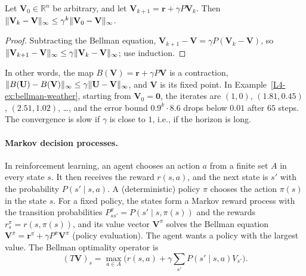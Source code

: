 \begin{proposition}\label{L4-prop:policy-evaluation}
    Let $\mathbf{V}_0 \in \mathbb{R}^n$ be arbitrary, and let $\mathbf{V}_{k+1} = \mathbf{r} + \gamma P\mathbf{V}_k$. Then $\lVert \mathbf{V}_k - \mathbf{V} \rVert_\infty \leq \gamma^k\lVert \mathbf{V}_0 - \mathbf{V} \rVert_\infty$.
\end{proposition}

\begin{proof}
    Subtracting the Bellman equation, $\mathbf{V}_{k+1} - \mathbf{V} = \gamma P(\mathbf{V}_k - \mathbf{V})$, so $\lVert \mathbf{V}_{k+1} - \mathbf{V} \rVert_\infty \leq \gamma\lVert \mathbf{V}_k - \mathbf{V} \rVert_\infty$; use induction.
\end{proof}

In other words, the map $B(\mathbf{V}) = \mathbf{r} + \gamma P\mathbf{V}$ is a contraction, $\lVert B(\mathbf{U}) - B(\mathbf{V}) \rVert_\infty \leq \gamma\lVert \mathbf{U} - \mathbf{V} \rVert_\infty$, and $\mathbf{V}$ is its fixed point. In Example~\ref{L4-ex:bellman-weather}, starting from $\mathbf{V}_0 = \mathbf{0}$, the iterates are $(1, 0)$, $(1.81, 0.45)$, $(2.51, 1.02)$, \ldots, and the error bound $0.9^k \cdot 8.6$ drops below $0.01$ after $65$ steps. The convergence is slow if $\gamma$ is close to $1$, i.e., if the horizon is long.

\paragraph{Markov decision processes.} In reinforcement learning, an agent chooses an action $a$ from a finite set $A$ in every state $s$. It then receives the reward $r(s, a)$, and the next state is $s'$ with the probability $P(s' \mid s, a)$. A (deterministic) policy $\pi$ chooses the action $\pi(s)$ in the state $s$. For a fixed policy, the states form a Markov reward process with the transition probabilities $P^\pi_{ss'} = P(s' \mid s, \pi(s))$ and the rewards $r^\pi_s = r(s, \pi(s))$, and its value vector $\mathbf{V}^\pi$ solves the Bellman equation $\mathbf{V}^\pi = \mathbf{r}^\pi + \gamma P^\pi\mathbf{V}^\pi$ (policy evaluation). The agent wants a policy with the largest value. The Bellman optimality operator is
\[(T\mathbf{V})_s = \max_{a \in A}\Big(r(s, a) + \gamma\sum_{s'}P(s' \mid s, a)V_{s'}\Big).\]

